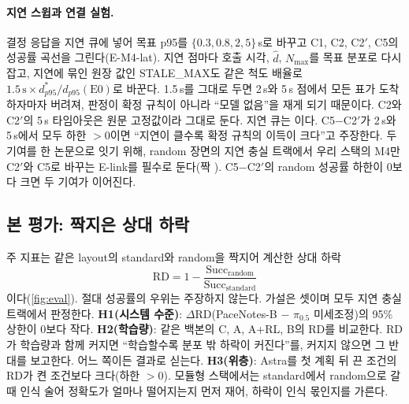 \paragraph{지연 스윕과 연결 실험.}
결정 응답을 지연 큐에 넣어 목표 p95를 $\{0.3, 0.8, 2, 5\}$\,s로 바꾸고 C1, C2, C2$'$, C5의 성공률 곡선을 그린다(E-M4-lat). 지연 점마다 호출 시각, $\hat d$, $N_{\max}$를 목표 분포로 다시 잡고, 지연에 묶인 원장 값인 STALE\_MAX도 같은 척도 배율로 $1.5\,\text{s}\times d^\ast_{p95}/d_{p95}(\text{E0})$로 바꾼다. 1.5\,s를 그대로 두면 2\,s와 5\,s 점에서 모든 표가 도착하자마자 버려져, 판정이 확정 규칙이 아니라 ``모델 없음''을 재게 되기 때문이다. C2와 C2$'$의 5\,s 타임아웃은 원문 고정값이라 그대로 둔다. 지연 큐는 이다. C5$-$C2$'$가 2\,s와 5\,s에서 모두 하한 $>0$이면 ``지연이 클수록 확정 규칙의 이득이 크다''고 주장한다. 두 기여를 한 논문으로 잇기 위해, random 장면의 지연 충실 트랙에서 우리 스택의 M4만 C2$'$와 C5로 바꾸는 E-link를 필수로 둔다(짝 ). C5$-$C2$'$의 random 성공률 하한이 0보다 크면 두 기여가 이어진다.

\subsection{본 평가: 짝지은 상대 하락}
\label{sec:plan_rd}

주 지표는 같은 layout의 standard와 random을 짝지어 계산한 상대 하락
\begin{equation}
  \mathrm{RD} = 1-\frac{\mathrm{Succ}_{\text{random}}}{\mathrm{Succ}_{\text{standard}}}
\end{equation}
이다(\cref{fig:eval}). 절대 성공률의 우위는 주장하지 않는다. 가설은 셋이며 모두 지연 충실 트랙에서 판정한다. \textbf{H1(시스템 수준)}: $\Delta\mathrm{RD}$(PaceNotes-B $-$ $\pi_{0.5}$ 미세조정)의 95\% 상한이 0보다 작다. \textbf{H2(학습량)}: 같은 백본의 C, A, A+RL, B의 RD를 비교한다. RD가 학습량과 함께 커지면 ``학습할수록 분포 밖 하락이 커진다''를, 커지지 않으면 그 반대를 보고한다. 어느 쪽이든 결과로 싣는다. \textbf{H3(위층)}: Astra를 첫 계획 뒤 끈 조건의 RD가 켠 조건보다 크다(하한 $>0$). 모듈형 스택에서는 standard에서 random으로 갈 때 인식 술어 정확도가 얼마나 떨어지는지 먼저 재어, 하락이 인식 몫인지를 가른다.

